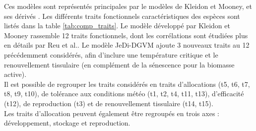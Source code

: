 \documentclass[french]{article}
\begin{document}
{\indent Ces modèles sont représentés principales par le modèles de Kleidon et Mooney, et ses dérivés \cite{Kleidon2000, Reu2010, Pavlick2013}. Les différents traits fonctionnels caractéristiques des espèces sont listés dans la table \ref{tab:comp_traits}. Le modèle développé par Kleidon et Mooney rassemble 12 traits fonctionnels, dont les corrélations sont étudiées plus en détails par Reu et al.\cite{Reu2010}. Le modèle JeDi-DGVM \cite{Pavlick2013} ajoute 3 nouveaux traits au 12 précédemment considérés, afin d'inclure une température critique et le renouvellement tissulaire (en complément de la sénescence pour la biomasse active).\\

Il est possible de regrouper les traits considérés en traits d'allocations (t5, t6, t7, t8, t9, t10), de tolérance aux conditions météo (t1, t2, t4, t11, t13), d'efficacité (t12), de  reproduction (t3) et de renouvellement tissulaire (t14, t15).\\
\indent Les traits d'allocation peuvent également être regroupés en trois axes : développement, stockage et reproduction.
}
\end{document}
